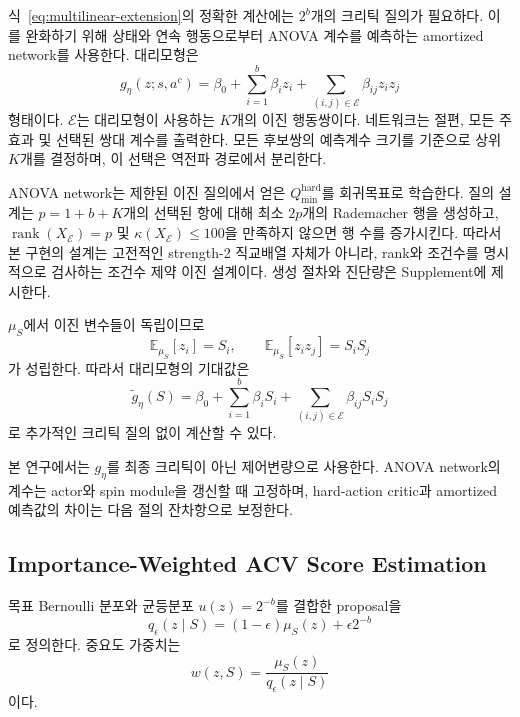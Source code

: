 \documentclass[10pt,journal]{IEEEtran}
\newcommand{\E}{\mathbb{E}}
\begin{document}
식~\eqref{eq:multilinear-extension}의 정확한 계산에는 $2^b$개의 크리틱 질의가 필요하다. 이를 완화하기 위해 상태와 연속 행동으로부터 ANOVA 계수를 예측하는 amortized network를 사용한다. 대리모형은
\begin{equation}
g_\eta(z;s,a^c)
=
\beta_0
+
\sum_{i=1}^{b}\beta_i z_i
+
\sum_{(i,j)\in\mathcal{E}}
\beta_{ij}z_i z_j
\label{eq:anova-surrogate}
\end{equation}
형태이다. $\mathcal{E}$는 대리모형이 사용하는 $K$개의 이진 행동쌍이다. 네트워크는 절편, 모든 주효과 및 선택된 쌍대 계수를 출력한다. 모든 후보쌍의 예측계수 크기를 기준으로 상위 $K$개를 결정하며, 이 선택은 역전파 경로에서 분리한다.

ANOVA network는 제한된 이진 질의에서 얻은
$Q_{\min}^{\mathrm{hard}}$를 회귀목표로 학습한다. 질의 설계는
$p=1+b+K$개의 선택된 항에 대해 최소 $2p$개의 Rademacher 행을 생성하고,
$\operatorname{rank}(X_{\mathcal E})=p$ 및
$\kappa(X_{\mathcal E})\leq100$을 만족하지 않으면 행 수를 증가시킨다.
따라서 본 구현의 설계는 고전적인 strength-2 직교배열 자체가 아니라,
rank와 조건수를 명시적으로 검사하는 조건수 제약 이진 설계이다.
생성 절차와 진단량은 Supplement에 제시한다.

$\mu_S$에서 이진 변수들이 독립이므로
\begin{equation}
\E_{\mu_S}[z_i]=S_i,
\qquad
\E_{\mu_S}[z_iz_j]=S_iS_j
\end{equation}
가 성립한다. 따라서 대리모형의 기대값은
\begin{equation}
\widetilde g_\eta(S)
=
\beta_0
+
\sum_{i=1}^{b}\beta_iS_i
+
\sum_{(i,j)\in\mathcal{E}}
\beta_{ij}S_iS_j
\label{eq:anova-expectation}
\end{equation}
로 추가적인 크리틱 질의 없이 계산할 수 있다.

본 연구에서는 $g_\eta$를 최종 크리틱이 아닌 제어변량으로 사용한다. ANOVA network의 계수는 actor와 spin module을 갱신할 때 고정하며, hard-action critic과 amortized 예측값의 차이는 다음 절의 잔차항으로 보정한다.


\subsection{Importance-Weighted ACV Score Estimation}

목표 Bernoulli 분포와 균등분포 $u(z)=2^{-b}$를 결합한 proposal을
\begin{equation}
q_\epsilon(z\mid S)
=
(1-\epsilon)\mu_S(z)+\epsilon 2^{-b}
\label{eq:proposal-distribution}
\end{equation}
로 정의한다. 중요도 가중치는
\begin{equation}
w(z,S)
=
\frac{\mu_S(z)}{q_\epsilon(z\mid S)}
\label{eq:importance-weight}
\end{equation}
이다.
\end{document}

